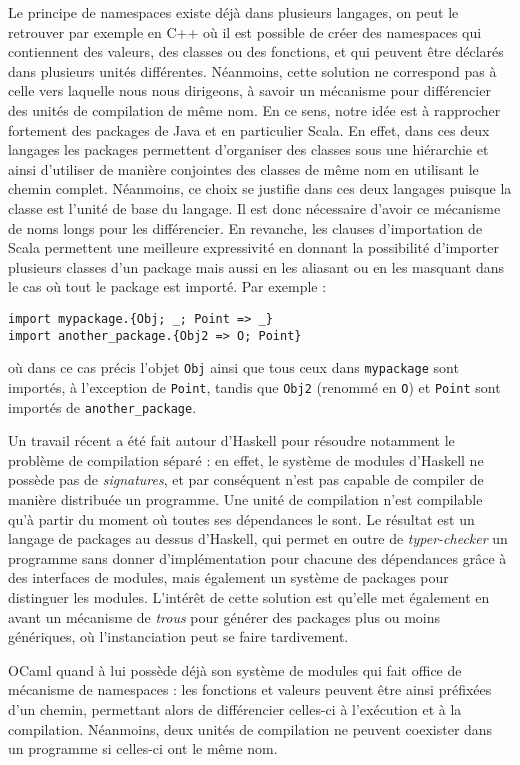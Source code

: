 \documentclass[11pt,a4paper]{report}
\begin{document}
Le principe de namespaces existe déjà dans plusieurs langages, on peut le
retrouver par exemple en C++\cite{cppspec} où il est possible de créer des
namespaces qui contiennent des valeurs, des classes ou des fonctions, et qui
peuvent être déclarés dans plusieurs unités différentes. Néanmoins, cette
solution ne correspond pas à celle vers laquelle nous nous dirigeons, à savoir
un mécanisme pour différencier des unités de compilation de même nom. En ce
sens, notre idée est à rapprocher fortement des packages de Java\cite{java-spec}
et en particulier Scala\cite{scalaspec}. En effet, dans ces deux langages les
packages permettent d'organiser des classes sous une hiérarchie et ainsi
d'utiliser de manière conjointes des classes de même nom en utilisant le chemin
complet. Néanmoins, ce choix se justifie dans ces deux langages puisque la 
classe est l'unité de base du langage. Il est donc nécessaire d'avoir ce
mécanisme de noms longs pour les différencier. En revanche, les clauses
d'importation de Scala permettent une meilleure expressivité en donnant la
possibilité d'importer plusieurs classes d'un package mais aussi en les aliasant
ou en les masquant dans le cas où tout le package est importé. Par exemple :
\begin{verbatim}
import mypackage.{Obj; _; Point => _}
import another_package.{Obj2 => O; Point}
\end{verbatim}
où dans ce cas précis l'objet \texttt{Obj} ainsi que tous ceux dans
\texttt{mypackage} sont importés, à l'exception de \texttt{Point}, tandis que
\texttt{Obj2} (renommé en \texttt{O}) et \texttt{Point} sont importés de
\texttt{another_package}.

Un travail récent a été fait autour d'Haskell pour résoudre notamment
le problème de compilation séparé\cite{KilpatrickDJM14} : en effet, le système
de modules d'Haskell ne possède pas de \emph{signatures}, et par conséquent
n'est pas capable de compiler de manière distribuée un programme. Une unité de
compilation n'est compilable qu'à partir du moment où toutes ses dépendances le
sont. Le résultat est un langage de packages au dessus d'Haskell, qui permet en
outre de \emph{typer-checker} un programme sans donner d'implémentation pour
chacune des dépendances grâce à des interfaces de modules, mais également un
système de packages pour distinguer les modules. L'intérêt de cette solution est
qu'elle met également en avant un mécanisme de \emph{trous} pour générer des
packages plus ou moins génériques, où l'instanciation peut se faire tardivement.

OCaml quand à lui possède déjà son système de modules\cite{Leroy00} qui fait
office de mécanisme de namespaces : les fonctions et valeurs peuvent être ainsi
préfixées d'un chemin, permettant alors de différencier celles-ci à l'exécution
et à la compilation. Néanmoins, deux unités de compilation ne peuvent coexister
dans un programme si celles-ci ont le même nom.
\end{document}
